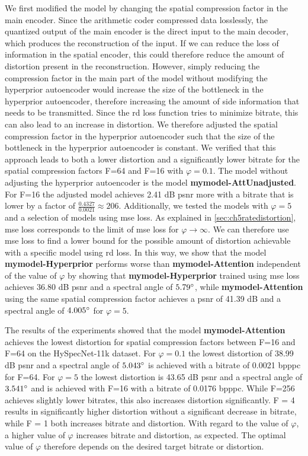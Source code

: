 We first modified the model by changing the spatial compression factor in the main encoder. Since the arithmetic coder compressed data losslessly, the quantized output of the main encoder is the direct input to the main decoder, which produces the reconstruction of the input. If we can reduce the loss of information in the spatial encoder, this could therefore reduce the amount of distortion present in the reconstruction. However, simply reducing the compression factor in the main part of the model without modifying the hyperprior autoencoder would increase the size of the bottleneck in the hyperprior autoencoder, therefore increasing the amount of side information that needs to be transmitted. Since the \ac{rd} loss function tries to minimize bitrate, this can also lead to an increase in distortion. We therefore adjusted the spatial compression factor in the hyperprior autoencoder such that the size of the bottleneck in the hyperprior autoencoder is constant. We verified that this approach leads to both a lower distortion and a significantly lower bitrate for the spatial compression factors F=64 and F=16 with $\varphi=0.1$. The model without adjusting the hyperprior autoencoder is the model \textbf{\ac{mymodel}-AttUnadjusted}. For F=16 the adjusted model achieves 2.41 dB \ac{psnr} more with a bitrate that is lower by a factor of $\frac{0.4327}{0.0021} \approx 206$. Additionally, we tested the models with $\varphi=5$ and a selection of models using \ac{mse} loss. As explained in \autoref{sec:ch5ratedistortion}, \ac{mse} loss corresponds to the limit of \ac{mse} loss for $\varphi\rightarrow\infty$. We can therefore use \ac{mse} loss to find a lower bound for the possible amount of distortion achievable with a specific model using \ac{rd} loss. In this way, we show that the model \textbf{\ac{mymodel}-Hyperprior} performs worse than \textbf{\ac{mymodel}-Attention} independent of the value of $\varphi$ by showing that \textbf{\ac{mymodel}-Hyperprior} trained using \ac{mse} loss achieves 36.80 dB \ac{psnr} and a spectral angle of $5.79 \degree$, while \textbf{\ac{mymodel}-Attention} using the same spatial compression factor achieves a \ac{psnr} of 41.39 dB and a spectral angle of $4.005 \degree$ for $\varphi=5$.

The results of the experiments showed that the model \textbf{\ac{mymodel}-Attention} achieves the lowest distortion for spatial compression factors between F=16 and F=64 on the HySpecNet-11k dataset. For $\varphi=0.1$ the lowest distortion of 38.99 dB \ac{psnr} and a spectral angle of $5.043 \degree$ is achieved with a bitrate of 0.0021 \ac{bpppc} for F=64. For $\varphi=5$ the lowest distortion is 43.65 dB \ac{psnr} and a spectral angle of $3.541 \degree$ and is achieved with F=16 with a bitrate of 0.0176 \ac{bpppc}. While F=256 achieves slightly lower bitrates, this also increases distortion significantly. F = 4 results in significantly higher distortion without a significant decrease in bitrate, while F = 1 both increases bitrate and distortion. With regard to the value of $\varphi$, a higher value of $\varphi$ increases bitrate and distortion, as expected. The optimal value of $\varphi$ therefore depends on the desired target bitrate or distortion. 

